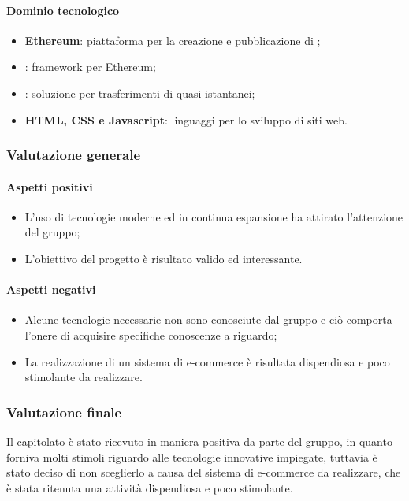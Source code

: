 			
			\paragraph{Dominio tecnologico}
			\begin{itemize}
				\item \textbf{Ethereum}: piattaforma per la creazione e pubblicazione di ;
				\item \textbf{}: framework per Ethereum;
				\item \textbf{}: soluzione per trasferimenti di  quasi istantanei;
				\item \textbf{HTML, CSS e Javascript}: linguaggi per lo sviluppo di siti web.
			\end{itemize}
		\subsubsection{Valutazione generale}
		\paragraph{Aspetti positivi}
		\begin{itemize}
			\item L'uso di tecnologie moderne ed in continua espansione ha attirato l'attenzione del gruppo;
			\item L'obiettivo del progetto è risultato valido ed interessante.
		\end{itemize}
		\paragraph{Aspetti negativi}
		\begin{itemize}
			\item Alcune tecnologie necessarie non sono conosciute dal gruppo e ciò comporta l'onere di acquisire specifiche conoscenze a riguardo;
			\item La realizzazione di un sistema di e-commerce è risultata dispendiosa e poco stimolante da realizzare.
		\end{itemize}
		\subsubsection{Valutazione finale }
		Il capitolato è stato ricevuto in maniera positiva da parte del gruppo, in quanto forniva molti stimoli riguardo alle tecnologie innovative impiegate, tuttavia è stato deciso di non sceglierlo a causa del sistema di e-commerce da realizzare, che è stata ritenuta una attività dispendiosa e poco stimolante.